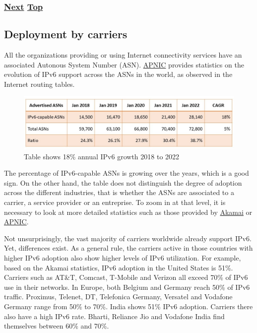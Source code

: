 \documentclass[
]{article}
\begin{document}
\subsubsection{\texorpdfstring{\hyperref[deployment-by-carriers]{Next}
\hyperref[deployment-status]{Top}}{Next Top}}\label{next-top-7}

\pagebreak

\subsection{Deployment by carriers}\label{deployment-by-carriers}

All the organizations providing or using Internet connectivity services
have an associated Autonous System Number (ASN).
\href{https://blog.apnic.net/2022/01/06/bgp-in-2021-the-bgp-table/}{APNIC}
provides statistics on the evolution of IPv6 support across the ASNs in
the world, as observed in the Internet routing tables.

\begin{figure}
\centering
\includegraphics{Section5_Table2.jpg}
\caption{Table shows 18\% annual IPv6 growth 2018 to 2022}
\end{figure}

The percentage of IPv6-capable ASNs is growing over the years, which is
a good sign. On the other hand, the table does not distinguish the
degree of adoption across the different industries, that is whether the
ASNs are associated to a carrier, a service provider or an entreprise.
To zoom in at that level, it is necessary to look at more detailed
statistics such as those provided by
\href{https://www.akamai.com/internet-station/cyber-attacks/state-of-the-internet-report/ipv6-adoption-visualization}{Akamai}
or \href{https://stats.labs.apnic.net}{APNIC}.

Not unsurprisingly, the vast majority of carriers worldwide already
support IPv6. Yet, differences exist. As a general rule, the carriers
active in those countries with higher IPv6 adoption also show higher
levels of IPv6 utilization. For example, based on the Akamai statistics,
IPv6 adoption in the United States is 51\%. Carriers such as AT\&T,
Comcast, T-Mobile and Verizon all exceed 70\% of IPv6 use in their
networks. In Europe, both Belgium and Germany reach 50\% of IPv6
traffic. Proximus, Telenet, DT, Telefonica Germany, Versatel and
Vodafone Germany range from 50\% to 70\%. India shows 51\% IPv6
adoption. Carriers there also have a high IPv6 rate. Bharti, Reliance
Jio and Vodafone India find themselves between 60\% and 70\%.
\end{document}
